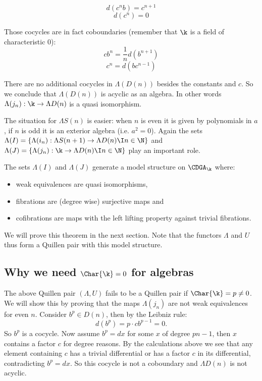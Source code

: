 $$ d(c^n b) = c^{n+1} $$
$$ d(c^n) = 0 $$

Those cocycles are in fact coboundaries (remember that $\k$ is a field of characteristic $0$):
$$ c b^n = \frac{1}{n} d(b^{n+1}) $$
$$ c^n = d(b c^{n-1}) $$

There are no additional cocycles in $\Lambda(D(n))$ besides the constants and $c$. So we conclude that $\Lambda(D(n))$ is acyclic as an algebra. In other words $\Lambda(j_n): \k \to \Lambda D(n)$ is a quasi isomorphism.

The situation for $\Lambda S(n)$ is easier: when $n$ is even it is given by polynomials in $a$, if $n$ is odd it is an exterior algebra (i.e. $a^2 = 0$). Again the sets $\Lambda(I) = \{ \Lambda(i_n) : \Lambda S(n+1) \to \Lambda D(n) \I n \in \N\}$ and $\Lambda(J) = \{ \Lambda(j_n) : \k \to \Lambda D(n) \I n \in \N\}$ play an important role.

\begin{theorem}
	The sets $\Lambda(I)$ and $\Lambda(J)$ generate a model structure on $\CDGA_\k$ where:
	\begin{itemize}
		\item weak equivalences are quasi isomorphisms,
		\item fibrations are (degree wise) surjective maps and
		\item cofibrations are maps with the left lifting property against trivial fibrations.
	\end{itemize}
\end{theorem}

We will prove this theorem in the next section. Note that the functors $\Lambda$ and $U$ thus form a Quillen pair with this model structure.

\subsection{Why we need $\Char{\k} = 0$ for algebras}
The above Quillen pair $(\Lambda, U)$ fails to be a Quillen pair if $\Char{\k} = p \neq 0$. We will show this by proving that the maps $\Lambda(j_n)$ are not weak equivalences for even $n$. Consider $b^p \in D(n)$, then by the Leibniz rule:
$$ d(b^p) = p \cdot c b^{p-1} = 0. $$
So $b^p$ is a cocycle. Now assume $b^p = dx$ for some $x$ of degree $pn - 1$, then $x$ contains a factor $c$ for degree reasons. By the calculations above we see that any element containing $c$ has a trivial differential or has a factor $c$ in its differential, contradicting $b^p = dx$. So this cocycle is not a coboundary and $\Lambda D(n)$ is not acyclic.




